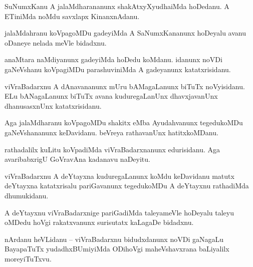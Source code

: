 \documentclass{article}
\begin{document}
\begin{mn}%
SuNumxKanu A jalaMdharananunx shakAtxyXyudhaiMda hoDedanu. A ETiniMda noMdu savxlapx KinanxnAdanu.
\end{mn}

\begin{mn}%
jalaMdahranu koVpagoMDu gadeyiMda A SaNumxKananunx hoDeyalu avanu oDaneye nelada meVle bidadxnu.
\end{mn}

\begin{mn}%
anaMtara naMdiyanunx gadeyiMda hoDedu koMdanu. idanunx noVDi gaNeVshanu koVpagiMDu parashuviniMda A 
gadeyanunx katatxrisidanu.
\end{mn}

\begin{mn}%
viVraBadarxnu A dAnavananunx mUru bAMagaLanunx biTuTx noVyisidanu. ELu bANagaLanunx biTuTx avana 
kuduregaLanUnx dhavxjavanUnx dhanusasxnUnx katatxrisidanu.
\end{mn}

\begin{mn}%
Aga jalaMdharanu koVpagoMDu shakitx eMba Ayudahvanunx tegedukoMDu gaNeVshananunx keDavidanu. 
beVreya rathavanUnx hatitxkoMDanu.
\end{mn}

\begin{mn}%
rathadalilx kuLitu koVpadiMda viVraBadarxnanunx edurisidanu. Aga avaribabxrigU GoVravAna kadanavu 
naDeyitu.
\end{mn}

\begin{mn}%
viVraBadarxnu A deYtayxna kuduregaLanunx koMdu keDavidanu matutx deYtayxna katatxrisalu 
pariGavanunx tegedukoMDu A deYtayxnu rathadiMda dhumukidanu. 
\end{mn}

\begin{mn}%
A deYtayxnu viVraBadarxnige pariGadiMda taleyameVle hoDeyalu taleyu oMDedu hoVgi rakatxvanunx 
surisutatx kaLagaDe bidadxnu.
\end{mn}


\begin{mn}%
nArdanu heVLidanu -- viVraBadarxnu bidudxdanunx noVDi gaNagaLu BayapaTuTx yudadhxBUmiyiMda ODihoVgi 
maheVshavxrana baLiyalilx moreyiTuTxvu.
\end{mn}
\end{document}
